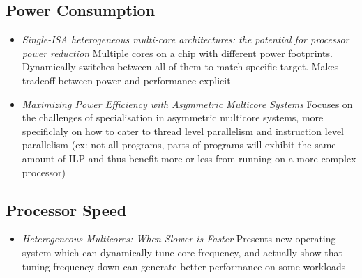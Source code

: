 \subsection{Power Consumption}
\begin{itemize}
\item \emph{Single-ISA heterogeneous multi-core architectures: the potential 
for processor power reduction}  Multiple cores on a chip with different power
footprints. Dynamically switches between all of them to match specific target.
Makes tradeoff between power and performance explicit \cite{KFJRT:03}
\item \emph {Maximizing Power Efficiency with Asymmetric Multicore Systems
} Focuses on the challenges of specialisation in asymmetric multicore systems,
more specificlaly on how to cater to thread level parallelism and instruction level
parallelism (ex: not all programs, parts of programs will exhibit the same
amount of ILP and thus benefit more or less from running on a more complex
processor) \cite{FSSP:09}
\end{itemize}
\subsection{Processor Speed}
\begin{itemize}
\item \emph{Heterogeneous Multicores: When Slower is Faster}
Presents new operating system which can dynamically tune core
frequency, and actually show that tuning frequency down
can generate better performance on some workloads \cite{HBT}
\end{itemize}
